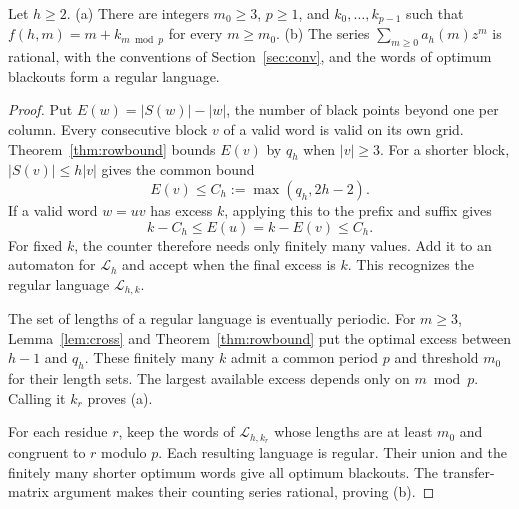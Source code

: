 \begin{theorem}\label{thm:periodic}
Let $h\ge2$. (a) There are integers $m_0\ge3$, $p\ge1$, and $k_0,\dots,k_{p-1}$ such that $f(h,m)=m+k_{m\bmod p}$ for every $m\ge m_0$. (b) The series $\sum_{m\ge0}a_h(m)z^m$ is rational, with the conventions of Section~\ref{sec:conv}, and the words of optimum blackouts form a regular language.
\end{theorem}

\begin{proof}
Put $E(w)=|S(w)|-|w|$, the number of black points beyond one per column.
Every consecutive block $v$ of a valid word is valid on its own grid.
Theorem~\ref{thm:rowbound} bounds $E(v)$ by $q_h$ when $|v|\ge3$.
For a shorter block, $|S(v)|\le h|v|$ gives the common bound
\[
 E(v)\le C_h:=\max(q_h,2h-2).
\]
If a valid word $w=uv$ has excess $k$, applying this to the prefix and
suffix gives
\[
 k-C_h\le E(u)=k-E(v)\le C_h.
\]
For fixed $k$, the counter therefore needs only finitely many values.
Add it to an automaton for $\mathcal L_h$ and accept when the final excess
is $k$. This recognizes the regular language $\mathcal L_{h,k}$.

The set of lengths of a regular language is eventually periodic. For
$m\ge3$, Lemma~\ref{lem:cross} and Theorem~\ref{thm:rowbound} put the
optimal excess between $h-1$ and $q_h$. These finitely many
$k$ admit a common period $p$ and threshold $m_0$ for their length sets.
The largest available excess depends only on $m\bmod p$.
Calling it $k_r$ proves (a).

For each residue $r$, keep the words of $\mathcal L_{h,k_r}$ whose lengths
are at least $m_0$ and congruent to $r$ modulo $p$. Each resulting language is regular.
Their union and the finitely many shorter optimum words give all optimum
blackouts. The transfer-matrix argument makes their counting series
rational, proving (b).
\end{proof}
